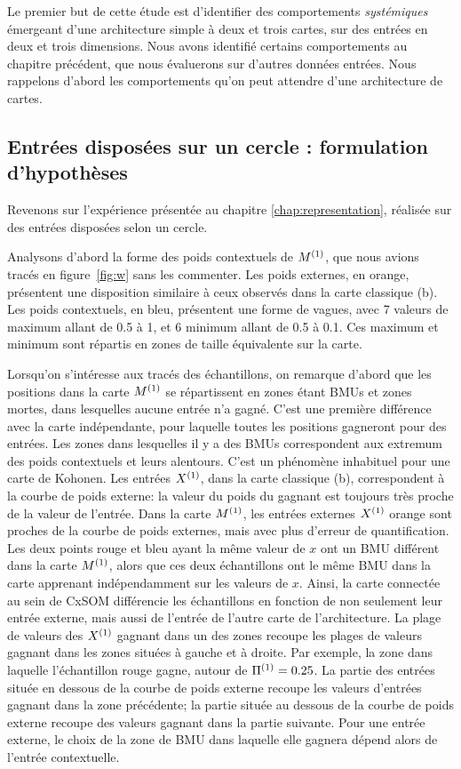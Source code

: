 \documentclass[../main]{subfiles}
\begin{document}
Le premier but de cette étude est d'identifier des comportements \emph{systémiques} émergeant d'une architecture simple à deux et trois cartes, sur des entrées en deux et trois dimensions.
Nous avons identifié certains comportements au chapitre précédent, que nous évaluerons sur d'autres données entrées. Nous rappelons d'abord les comportements qu'on peut attendre d'une architecture de cartes.

\subsection{Entrées disposées sur un cercle : formulation d'hypothèses}

Revenons sur l'expérience présentée au chapitre \ref{chap:representation}, réalisée sur des entrées disposées selon un cercle. 

Analysons d'abord la forme des poids contextuels de $M^{({1})}$, que nous avions tracés en figure~\ref{fig:w} sans les commenter. Les poids externes, en orange, présentent une disposition similaire à ceux observés dans la carte classique (b). Les poids contextuels, en bleu, présentent une forme de vagues, avec 7 valeurs de maximum allant de 0.5 à 1, et 6 minimum allant de 0.5 à 0.1. Ces maximum et minimum sont répartis en zones de taille équivalente sur la carte. 

Lorsqu'on s'intéresse aux tracés des échantillons, on remarque d'abord que les positions dans la carte $M^{({1})}$ se répartissent en zones étant BMUs et zones mortes, dans lesquelles aucune entrée n'a gagné. C'est une première différence avec la carte indépendante, pour laquelle toutes les positions gagneront pour des entrées. Les zones dans lesquelles il y a des BMUs correspondent aux extremum des poids contextuels et leurs alentours. C'est un phénomène inhabituel pour une carte de Kohonen. Les entrées $X^{({1})}$, dans la carte classique (b), correspondent à la courbe de poids externe: la valeur du poids du gagnant est toujours très proche de la valeur de l'entrée. Dans la carte $M^{({1})}$, les entrées externes $X^{({1})}$ orange sont proches de la courbe de poids externes, mais avec plus d'erreur de quantification.
Les deux points rouge et bleu ayant la même valeur de $x$ ont un BMU différent dans la carte $M^{({1})}$, alors que ces deux échantillons ont le même BMU dans la carte apprenant indépendamment sur les valeurs de $x$. Ainsi, la carte connectée au sein de CxSOM différencie les échantillons en fonction de non seulement leur entrée externe, mais aussi de l'entrée de l'autre carte de l'architecture. La plage de valeurs des $X^{({1})}$ gagnant dans un des zones recoupe les plages de valeurs gagnant dans les zones situées à gauche et à droite. Par exemple, la zone dans laquelle l'échantillon rouge gagne, autour de $\Pi^{({1})} = 0.25$. La partie des entrées située en dessous de la courbe de poids externe recoupe les valeurs d'entrées gagnant dans la zone précédente; la partie située au dessous de la courbe de poids externe recoupe des valeurs gagnant dans la partie suivante. Pour une entrée externe, le choix de la zone de BMU dans laquelle elle gagnera dépend alors de l'entrée contextuelle. 
\end{document}
